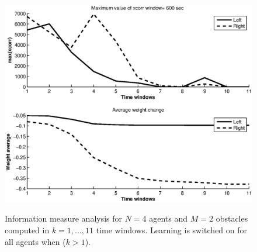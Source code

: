 \begin{figure}[htbp]
\begin{center}
{	\includegraphics[scale=0.3]{figures/infomeasure/N4/maxcorr_N=3_w=600.eps}}
	\hspace{1pt}
    \caption[Max correlation for 4 learning agents B]{
	Information measure analysis for $N=4$ agents and $M=2$ obstacles computed
	in $k=1,...,11$ time windows. Learning is switched on for all agents
	when ($k>1$). \label{fig:N4M2b}}
  \end{center}
\end{figure}

